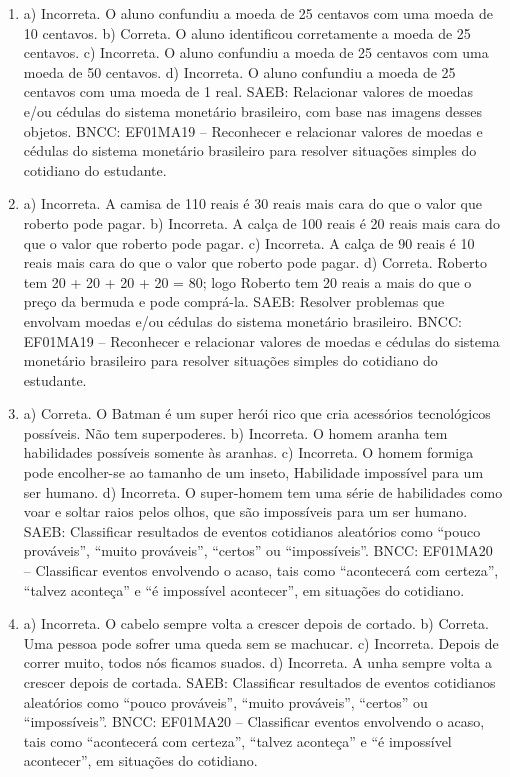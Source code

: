 \begin{enumerate}
\item
a) Incorreta. O aluno confundiu a moeda de 25 centavos com uma moeda de
10 centavos.
b) Correta. O aluno identificou corretamente a moeda de 25 centavos.
c) Incorreta. O aluno confundiu a moeda de 25 centavos com uma moeda de
50 centavos.
d) Incorreta. O aluno confundiu a moeda de 25 centavos com uma moeda de
1 real.
SAEB: Relacionar valores de moedas e/ou cédulas do sistema
monetário brasileiro, com base nas imagens desses objetos.
BNCC: EF01MA19 -- Reconhecer e relacionar valores de moedas e cédulas do
sistema monetário brasileiro para resolver situações simples do
cotidiano do estudante.

\item
a) Incorreta. A camisa de 110 reais é 30 reais mais cara do que o valor que
roberto pode pagar.
b) Incorreta. A calça de 100 reais é 20 reais mais cara do que o valor que
roberto pode pagar.
c) Incorreta. A calça de 90 reais é 10 reais mais cara do que o valor que
roberto pode pagar.
d) Correta. Roberto tem 20 + 20 + 20 + 20 = 80; logo Roberto tem 20
reais a mais do que o preço da bermuda e pode comprá-la.
SAEB: Resolver problemas que envolvam moedas e/ou cédulas do
sistema monetário brasileiro.
BNCC: EF01MA19 -- Reconhecer e relacionar valores de moedas e cédulas do
sistema monetário brasileiro para resolver situações simples do
cotidiano do estudante.

\item
a) Correta. O Batman é um super herói rico que cria acessórios
tecnológicos possíveis. Não tem superpoderes.
b) Incorreta. O homem aranha tem habilidades possíveis somente às
aranhas.
c) Incorreta. O homem formiga pode encolher-se ao tamanho de um inseto,
Habilidade impossível para um ser humano.
d) Incorreta. O super-homem tem uma série de habilidades como voar e
soltar raios pelos olhos, que são impossíveis para um ser humano.
SAEB: Classificar resultados de eventos cotidianos aleatórios como
``pouco prováveis'', ``muito prováveis'', ``certos'' ou ``impossíveis''.
BNCC: EF01MA20 -- Classificar eventos envolvendo o acaso, tais como
``acontecerá com certeza'', ``talvez aconteça'' e ``é impossível
acontecer'', em situações do cotidiano.

\item
a) Incorreta. O cabelo sempre volta a crescer depois de cortado.
b) Correta. Uma pessoa pode sofrer uma queda sem se machucar.
c) Incorreta. Depois de correr muito, todos nós ficamos suados.
d) Incorreta. A unha sempre volta a crescer depois de cortada.
SAEB: Classificar resultados de eventos cotidianos aleatórios como
``pouco prováveis'', ``muito prováveis'', ``certos'' ou ``impossíveis''.
BNCC: EF01MA20 -- Classificar eventos envolvendo o acaso, tais como
``acontecerá com certeza'', ``talvez aconteça'' e ``é impossível
acontecer'', em situações do cotidiano.


\end{enumerate}
